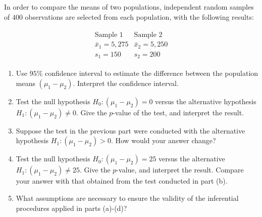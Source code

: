 
\begin{exercise}[Mechanics]

In order to compare the means of two populations, independent random samples of $400$ observations are selected from each population, with the following results:

\begin{align*}
    \begin{array}{ll}
        \text{Sample $1$}
        &
        \text{Sample $2$} \\
        \bar x_1 = 5,275
        &
        \bar x_2 = 5,250 \\
        s_1 = 150
        &
        s_2 = 200
    \end{array}
\end{align*}

\begin{enumerate}[label = (\alph*)]

    \item Use $95 \%$ confidence interval to estimate the difference between the population means $(\mu_1 - \mu_2)$.
    Interpret the confidence interval.

    \item Test the null hypothesis $H_0: (\mu_1 - \mu_2) = 0$ versus the alternative hypothesis $H_1: (\mu_1 - \mu_2) \neq 0$.
    Give the $p$-value of the test, and interpret the result.

    \item Suppose the test in the previous part were conducted with the alternative hypothesis $H_1: (\mu_1 - \mu_2) > 0$.
    How would your answer change?

    \item Test the null hypothesis $H_0: (\mu_1 - \mu_2) = 25$ versus the alternative $H_1: (\mu_1 - \mu_2) \neq 25$.
    Give the $p$-value, and interpret the result.
    Compare your answer with that obtained from the test conducted in part (b).

    \item What assumptions are necessary to ensure the validity of the inferential procedures applied in parts (a)-(d)?

\end{enumerate}

\end{exercise}


